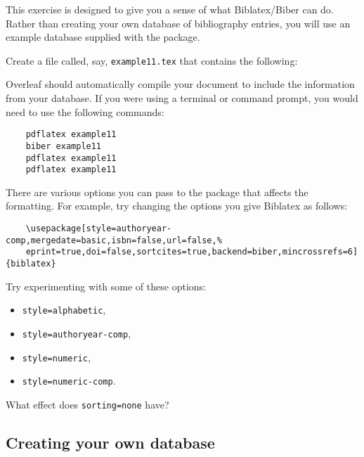 \begin{exercise}\label{ex:biblatex-example}
  This exercise is designed to give you a sense of what Biblatex/Biber can do.
  Rather than creating your own database of bibliography entries, you will use an example database supplied with the  package.

  Create a file called, say, \texttt{example11.tex} that contains the following: 

  Overleaf should automatically compile your document to include the information from your database.
  If you were using a terminal or command prompt, you would need to use the following commands:
  \begin{verbatim}
    pdflatex example11
    biber example11
    pdflatex example11
    pdflatex example11
  \end{verbatim}

  There are various options you can pass to the  package that affects the formatting.
  For example, try changing the options you give Biblatex as follows:
  \begin{verbatim}
    \usepackage[style=authoryear-comp,mergedate=basic,isbn=false,url=false,%
    eprint=true,doi=false,sortcites=true,backend=biber,mincrossrefs=6]{biblatex}
  \end{verbatim}
  Try experimenting with some of these options:
  \begin{itemize}
    \item \texttt{style=alphabetic},
    \item \texttt{style=authoryear-comp},
    \item \texttt{style=numeric},
    \item \texttt{style=numeric-comp}.
  \end{itemize}
  What effect does \texttt{sorting=none} have?
\end{exercise}

\subsection{Creating your own database}\label{subsec:database}

